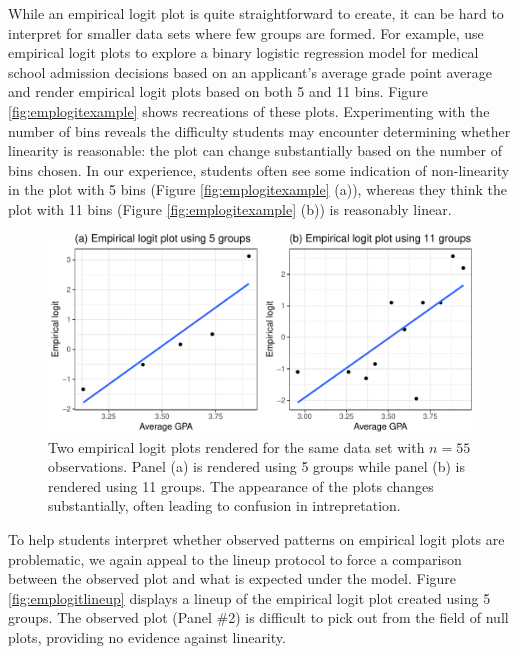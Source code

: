 \documentclass[12pt]{article}
\begin{document}
While an empirical logit plot is quite straightforward to create, it can
be hard to interpret for smaller data sets where few groups are formed.
For example, \citet{stat2} use empirical logit plots to explore a binary
logistic regression model for medical school admission decisions based
on an applicant's average grade point average and render empirical logit
plots based on both 5 and 11 bins. Figure \ref{fig:emplogitexample}
shows recreations of these plots. Experimenting with the number of bins
reveals the difficulty students may encounter determining whether
linearity is reasonable: the plot can change substantially based on the
number of bins chosen. In our experience, students often see some
indication of non-linearity in the plot with 5 bins (Figure
\ref{fig:emplogitexample} (a)), whereas they think the plot with 11 bins
(Figure \ref{fig:emplogitexample} (b)) is reasonably linear.

\clearpage

\begin{figure}

{\centering \includegraphics[width=0.8\linewidth]{vizinf-paper_files/figure-latex/unnamed-chunk-7-1} 

}

\caption{\label{fig:emplogitexample} Two empirical logit plots rendered for the same data set with $n=55$ observations. Panel (a) is rendered using 5 groups while panel (b) is rendered using 11 groups. The appearance of the plots changes substantially, often leading to confusion in intrepretation.}\label{fig:unnamed-chunk-7}
\end{figure}

To help students interpret whether observed patterns on empirical logit
plots are problematic, we again appeal to the lineup protocol to force a
comparison between the observed plot and what is expected under the
model. Figure \ref{fig:emplogitlineup} displays a lineup of the
empirical logit plot created using 5 groups. The observed plot (Panel
\#2) is difficult to pick out from the field of null plots, providing no
evidence against linearity.
\end{document}
